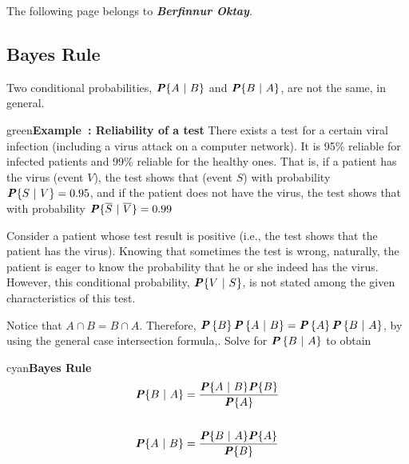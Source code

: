 \documentclass{article}
\newcounter{example}
\newenvironment{example}[1]{\begin{mybox}{green}{\refstepcounter{example}\textbf{Example~\theexample #1}}}{\end{mybox}}
\newenvironment{formula}[1]{\begin{mybox}{cyan}{\textbf{#1}}}{\end{mybox}}
\newcommand{\prob}[1]{\textbf{\textit{P}}\left\{#1\right\}}
\begin{document}
The following page belongs to \textbf{\textit{Berfinnur Oktay}}.



\subsection{Bayes Rule}

Two conditional probabilities, $\textbf{\textit{P}}\{A\ |\ B\}$ and $\textbf{\textit{P}}\{B\ |\ A\}$, are not the same, in general.

\begin{example}{: Reliability of a test}
There exists a test for a certain viral infection (including a virus attack on a computer network). It is 95\% reliable for infected patients and 99\% reliable for the healthy ones. That is, if a patient has the virus (event $V$), the test shows that (event $S$) with probability $\textbf{\textit{P}}\{S\ |\ V\} = 0.95$, and if the patient does not have the virus, the test shows that with probability $\textbf{\textit{P}}\{\overline{S}\ |\ \overline{V}\} = 0.99$

Consider a patient whose test result is positive (i.e., the test shows that the patient has the virus). Knowing that sometimes the test is wrong, naturally, the patient is eager to know the probability that he or she indeed has the virus. However, this conditional probability, $\textbf{\textit{P}}\{V\ |\ S\}$, is not stated among the given characteristics of this test.
\end{example}

\noindent Notice that $A \cap B = B \cap A$. Therefore, $\prob{B} \prob{A\ |\ B} = \prob{A} \prob{B\ |\ A}$, by using the general case intersection formula,. Solve for $\prob{B\ |\ A}$ to obtain

\begin{formula}{Bayes Rule}
\begin{align*}
    \textbf{\textit{P}}\{B\ |\ A\} &= \frac{\textbf{\textit{P}}\{A\ |\ B\} \textbf{\textit{P}}\{B\}}{\textbf{\textit{P}}\{A\}}\\&\\
    \textbf{\textit{P}}\{A\ |\ B\} &= \frac{\textbf{\textit{P}}\{B\ |\ A\} \textbf{\textit{P}}\{A\}}{\textbf{\textit{P}}\{B\}}
\end{align*}
\end{formula}
\end{document}
